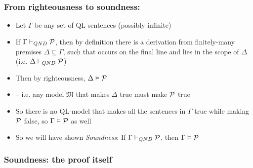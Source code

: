 \begin{frame}
\frametitle{From righteousness to soundness:}

\begin{itemize}[<+->]


\item Let $\Gamma$ be any set of QL sentences (possibly infinite)

\item If $\Gamma \vdash_{QND} \mathcal{P}$, then by definition there is a derivation from finitely-many premises $\Delta \subseteq \Gamma$, such that  occurs on the final line and lies in the scope of $\Delta$ (i.e. $\Delta \vdash_{QND} \mathcal{P}$)

\item Then by righteousness, $\Delta \vDash \mathcal{P}$

\item[] -- i.e. any model $\mathfrak{M}$ that makes $\Delta$ true must make $\mathcal{P}$ true


\item So there is no QL-model that makes all the sentences in $\Gamma$ true while making $\mathcal{P}$ false, so $\Gamma \vDash \mathcal{P}$ as well

\item So we will have shown \emph{Soundness}: If $\Gamma \vdash_{QND} \mathcal{P}$, then $\Gamma \vDash \mathcal{P}$

\end{itemize}
\end{frame}

\subsubsection{Soundness: the proof itself}

